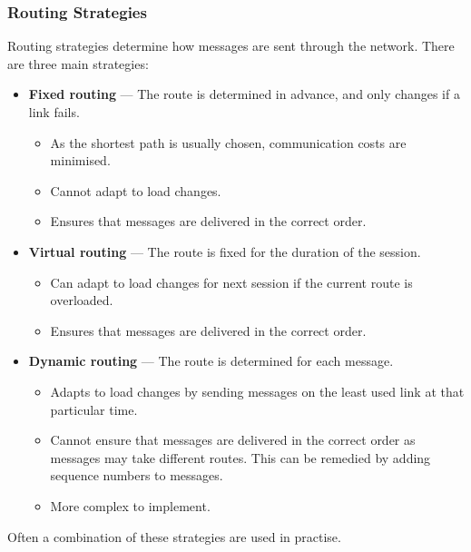 \documentclass{article}
\begin{document}
\subsubsection{Routing Strategies}
Routing strategies determine how messages are sent through the network.
There are three main strategies:
\begin{itemize}
    \item \textbf{Fixed routing} --- The route is determined in advance,
          and only changes if a link fails.
          \begin{itemize}
              \item As the shortest path is usually chosen,
                    communication costs are minimised.
              \item Cannot adapt to load changes.
              \item Ensures that messages are delivered in the correct
                    order.
          \end{itemize}
    \item \textbf{Virtual routing} --- The route is fixed for the
          duration of the session.
          \begin{itemize}
              \item Can adapt to load changes for next session if the
                    current route is overloaded.
              \item Ensures that messages are delivered in the correct
                    order.
          \end{itemize}
    \item \textbf{Dynamic routing} --- The route is determined for each
          message.
          \begin{itemize}
              \item Adapts to load changes by sending messages on the
                    least used link at that particular time.
              \item Cannot ensure that messages are delivered in the
                    correct order as messages may take different
                    routes. This can be remedied by adding sequence
                    numbers to messages.
              \item More complex to implement.
          \end{itemize}
\end{itemize}
Often a combination of these strategies are used in practise.
\end{document}
